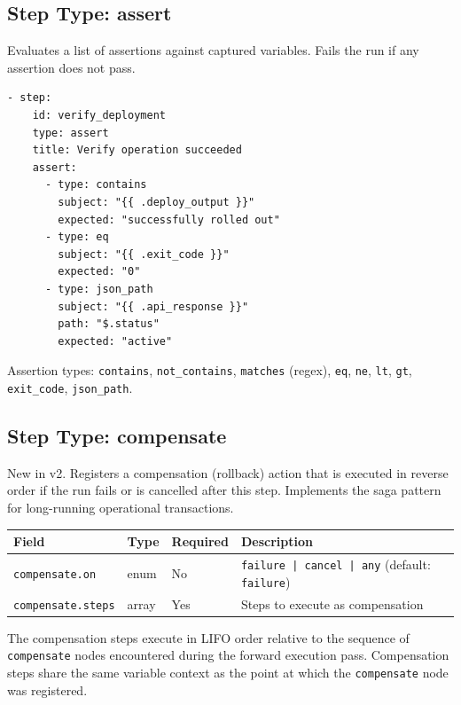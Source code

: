 \subsection{Step Type: assert}
\label{subsec:step-assert}

Evaluates a list of assertions against captured variables.  Fails the run if
any assertion does not pass.

\begin{verbatim}
- step:
    id: verify_deployment
    type: assert
    title: Verify operation succeeded
    assert:
      - type: contains
        subject: "{{ .deploy_output }}"
        expected: "successfully rolled out"
      - type: eq
        subject: "{{ .exit_code }}"
        expected: "0"
      - type: json_path
        subject: "{{ .api_response }}"
        path: "$.status"
        expected: "active"
\end{verbatim}

Assertion types: \texttt{contains}, \texttt{not\_contains}, \texttt{matches}
(regex), \texttt{eq}, \texttt{ne}, \texttt{lt}, \texttt{gt}, \texttt{exit\_code},
\texttt{json\_path}.

\subsection{Step Type: compensate}
\label{subsec:step-compensate}

New in v2.  Registers a compensation (rollback) action that is executed in
reverse order if the run fails or is cancelled after this step.  Implements the
saga pattern for long-running operational transactions.

\begin{center}
\begin{tabular}{lllp{5cm}}
\hline
\textbf{Field} & \textbf{Type} & \textbf{Required} & \textbf{Description} \\
\hline
\texttt{compensate.on}   & enum  & No  & \texttt{failure | cancel | any} (default: \texttt{failure}) \\
\texttt{compensate.steps}& array & Yes & Steps to execute as compensation \\
\hline
\end{tabular}
\end{center}

The compensation steps execute in LIFO order relative to the sequence of
\texttt{compensate} nodes encountered during the forward execution pass.
Compensation steps share the same variable context as the point at which the
\texttt{compensate} node was registered.


